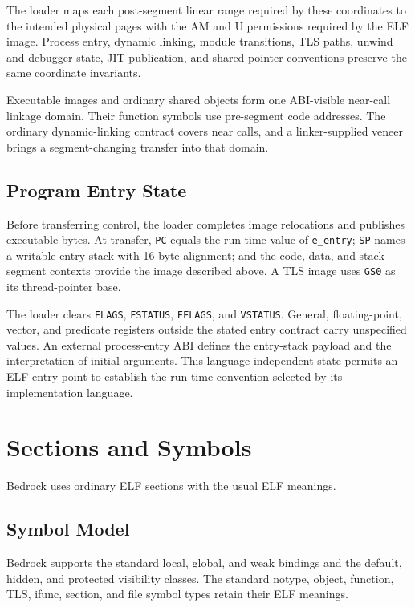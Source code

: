 \documentclass[10pt,twoside]{article}
\begin{document}
The loader maps each post-segment linear range required by these coordinates
to the intended physical pages with the AM and U permissions required by the
ELF image. Process entry, dynamic linking, module transitions, TLS paths,
unwind and debugger state, JIT publication, and shared pointer conventions
preserve the same coordinate invariants.

Executable images and ordinary shared objects form one ABI-visible near-call
linkage domain. Their function symbols use pre-segment code addresses. The
ordinary dynamic-linking contract covers near calls, and a linker-supplied
veneer brings a segment-changing transfer into that domain.

\subsection{Program Entry State}
Before transferring control, the loader completes image relocations and
publishes executable bytes. At transfer, \texttt{PC} equals the run-time value
of \texttt{e\_entry}; \texttt{SP} names a writable entry stack with 16-byte
alignment; and the code, data, and stack segment contexts provide the image
described above. A TLS image uses \texttt{GS0} as its thread-pointer base.

The loader clears \texttt{FLAGS}, \texttt{FSTATUS}, \texttt{FFLAGS}, and
\texttt{VSTATUS}.
General, floating-point, vector, and predicate registers outside the stated
entry contract carry unspecified values. An external process-entry ABI defines
the entry-stack payload and the interpretation of initial arguments. This
language-independent state permits an ELF entry point to establish the
run-time convention selected by its implementation language.

\BedrockGeneratedELFEntryStateTable

\clearpage
\section{Sections and Symbols}\label{page:sections-and-symbols}
Bedrock uses ordinary ELF sections with the usual ELF meanings.
\subsection{Symbol Model}
Bedrock supports the standard local, global, and weak bindings and the
default, hidden, and protected visibility classes. The standard notype,
object, function, TLS, ifunc, section, and file symbol types retain their ELF
meanings.
\end{document}

